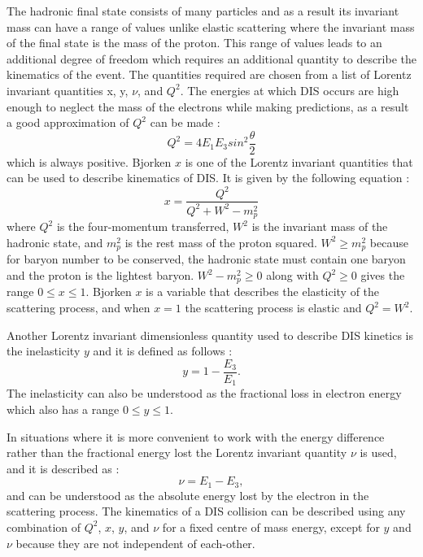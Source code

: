 \documentclass[journal, a4paper,11pt]{IEEEtran}
\begin{document}
The hadronic final state consists of many particles and as a result its invariant mass can have a range of values unlike elastic scattering where the invariant mass of the final state is the mass of the proton. This range of values leads to an additional degree of freedom which requires an additional quantity to describe the kinematics of the event. The quantities required are chosen from a list of Lorentz invariant quantities x, y, $\nu$, and $Q^2$. 
The energies at which DIS occurs are high enough to neglect the mass of the electrons while making predictions, as a result a good approximation of $Q^2$ can be made \cite{Modern}:
\begin{equation}
	Q^2 = 4E_1E_3sin^2\frac{\theta}{2}
	\label{eq:Q2}
\end{equation}
which is always positive.
Bjorken $x$ is one of the Lorentz invariant quantities that can be used to describe kinematics of DIS. It is given by the following equation \cite{Modern}: 
\begin{equation}
	x = \frac{Q^2}{Q^2 + W^2 - m_p^2}
	\label{eq:x}
\end{equation}
where $Q^2$ is the four-momentum transferred, $W^2$ is the invariant mass of the hadronic state, and $m_p^2$ is the rest mass of the proton squared. $W^2 \geq m_p^2$ because for baryon number to be conserved, the hadronic state must contain one baryon and the proton is the lightest baryon. $W^2 - m_p^2 \geq 0$ along with $Q^2 \geq 0$ gives the range $0 \leq x \leq 1$. Bjorken $x$ is a variable that describes the elasticity of the scattering process, and when $x = 1$ the scattering process is elastic and $Q^2 = W^2$.

Another Lorentz invariant dimensionless quantity used to describe DIS kinetics is the inelasticity $y$ and it is defined as follows \cite{Modern}:
\begin{equation}
	y = 1-\frac{E_3}{E_1}.
	\label{eq:y}
\end{equation}
The inelasticity can also be understood as the fractional loss in electron energy which also has a range $0 \leq y \leq 1$.

In situations where it is more convenient to work with the energy difference rather than the fractional energy lost the Lorentz invariant quantity $\nu$ is used, and it is described as \cite{Modern}:
\begin{equation}
	\nu = E_1 - E_3,
	\label{eq:nu}
\end{equation}
and can be understood as the absolute energy lost by the electron in the scattering process.
The kinematics of a DIS collision can be described using any combination of $Q^2$, $x$, $y$, and $\nu$ for a fixed centre of mass energy, except for $y$ and $\nu$ because they are not independent of each-other.
\end{document}
